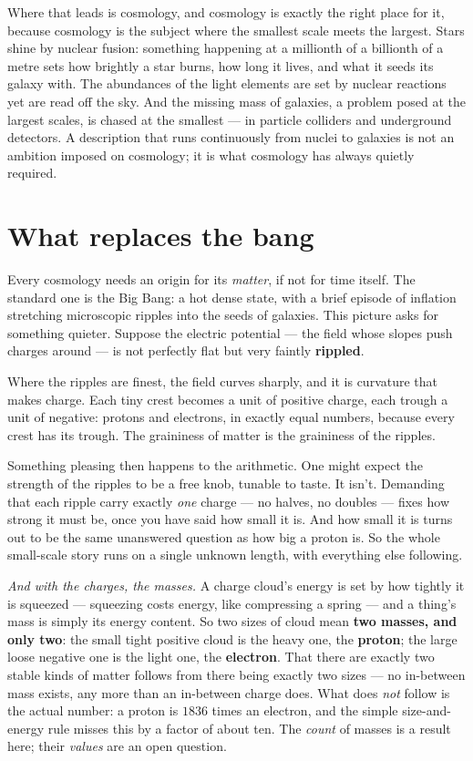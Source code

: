 \documentclass[11pt]{article}
\begin{document}
Where that leads is cosmology, and cosmology is exactly the right place for it, because cosmology is the subject
where the smallest scale meets the largest. Stars shine by nuclear fusion: something happening at a
millionth of a billionth of a metre sets how brightly a star burns, how long it lives, and what it seeds its galaxy
with. The abundances of the light elements are set by nuclear reactions yet are read off the sky. And the missing
mass of galaxies, a problem posed at the largest scales, is chased at the smallest --- in particle colliders and
underground detectors. A description that runs continuously from nuclei to galaxies is not an ambition imposed on
cosmology; it is what cosmology has always quietly required.

\section*{What replaces the bang}
Every cosmology needs an origin for its \emph{matter}, if not for time itself. The standard one is the Big Bang: a
hot dense state, with a brief episode of inflation stretching microscopic ripples into the seeds of galaxies. This
picture asks for something quieter. Suppose the electric potential --- the field whose slopes push charges around
--- is not perfectly flat but very faintly \textbf{rippled}.

Where the ripples are finest, the field curves sharply, and it is curvature that makes charge. Each tiny crest
becomes a unit of positive charge, each trough a unit of negative: protons and electrons, in exactly equal numbers,
because every crest has its trough. The graininess of matter is the graininess of the ripples.

Something pleasing then happens to the arithmetic. One might expect the strength of the ripples to be a free knob,
tunable to taste. It isn't. Demanding that each ripple carry exactly \emph{one} charge --- no halves, no doubles
--- fixes how strong it must be, once you have said how small it is. And how small it is turns out to be the same
unanswered question as how big a proton is. So the whole small-scale story runs on a single unknown length, with
everything else following.

\emph{And with the charges, the masses.} A charge cloud's energy is set by how tightly it is squeezed --- squeezing
costs energy, like compressing a spring --- and a thing's mass is simply its energy content. So two sizes of cloud
mean \textbf{two masses, and only two}: the small tight positive cloud is the heavy one, the \textbf{proton}; the
large loose negative one is the light one, the \textbf{electron}. That there are exactly two stable kinds of matter
follows from there being exactly two sizes --- no in-between mass exists, any more than an in-between charge does.
What does \emph{not} follow is the actual number: a proton is $1836$ times an electron, and the simple
size-and-energy rule misses this by a factor of about ten. The \emph{count} of masses is a result here; their
\emph{values} are an open question.
\end{document}
